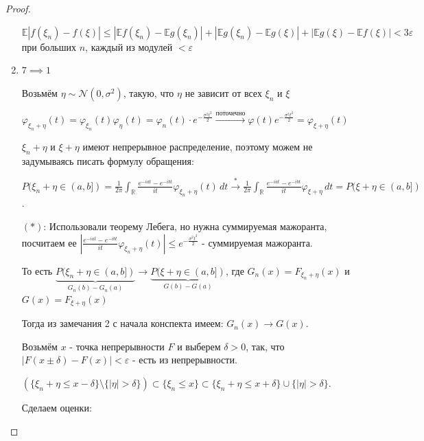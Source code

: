 \begin{proof}
\begin{enumerate}
{            $\mathbb{E} |f(\xi_n) - f(\xi)| \leqslant |\mathbb{E} f(\xi_n) - \mathbb{E} g(\xi_n)| + |\mathbb{E} g(\xi_n) - \mathbb{E} g(\xi)| + |\mathbb{E} g(\xi) - \mathbb{E} f(\xi) | < 3\varepsilon$ при больших $n$, каждый из модулей $< \varepsilon$
        }
        \item {
            $7 \implies 1$

            Возьмём $\eta \sim \mathcal{N} (0, \sigma^2)$, такую, что $\eta$ не зависит от всех $\xi_n$ и $\xi$

            $\varphi_{\xi_n + \eta} (t) = \varphi_{\xi_n} (t) \varphi_{\eta} (t) = \varphi_{n} (t) \cdot e^{-\frac{\sigma^2 t^2}{2}} \overset{\text{поточечно}}{\rightarrow} \varphi(t) e^{-\frac{\sigma^2t^2}{2}} = \varphi_{\xi + \eta} (t)$

            $\xi_n + \eta$ и $\xi + \eta$ имеют непрерывное распределение, поэтому можем не задумываясь писать формулу обращения:

            $P(\xi_n + \eta \in (a, b]) = \frac{1}{2\pi} \int_{\mathbb{R}} \frac{e^{-iat} - e^{-ibt}}{it} \varphi_{\xi_n + \eta} (t) \, dt \overset{*}{\rightarrow} \frac{1}{2\pi} \int_{\mathbb{R}} \frac{e^{-iat} - e^{-ibt}}{it} \varphi_{\xi + \eta} \, dt = P(\xi + \eta \in (a, b])$.

            $(*)$: Использовали теорему Лебега, но нужна суммируемая мажоранта, посчитаем ее $\left | \frac{e^{-iat} - e^{-ibt}}{it} \varphi_{\xi_n + \eta} (t) \right | \leqslant e^{-\frac{\sigma^2t^2}{2}}$ - суммируемая мажоранта.

            То есть $\underbrace{P(\xi_n + \eta \in (a, b])}_{G_n (b) - G_n(a)} \rightarrow \underbrace{P(\xi + \eta \in (a, b])}_{G(b) - G(a)}$, где $G_n (x) = F_{\xi_n + \eta}(x)$ и $G(x) = F_{\xi + \eta} (x)$

            Тогда из замечания 2 с начала конспекта имеем: $G_n(x) \rightarrow G(x)$.

            Возьмём $x$ - точка непрерывности $F$ и выберем $\delta > 0$, так, что $|F(x \pm \delta) - F(x)| < \varepsilon$ - есть из непрерывности.

            $ \left( \{ \xi_n + \eta \leqslant x - \delta \} \setminus \{ |\eta| > \delta \} \right) \subset  \{ \xi_n \leqslant x \} \subset \{ \xi_n + \eta \leqslant x + \delta \} \cup \{ |\eta| > \delta \}$.

            Сделаем оценки:

}
\end{enumerate}
\end{proof}

